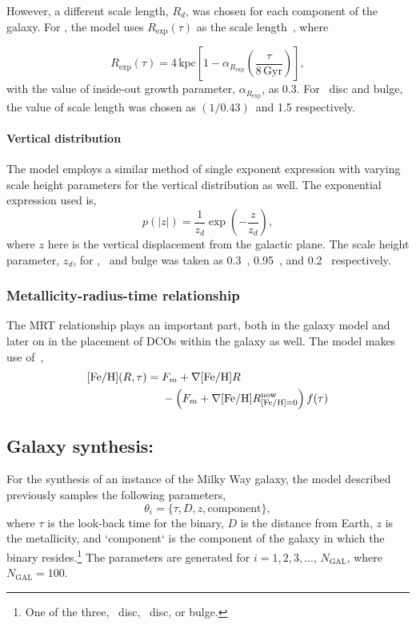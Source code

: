 However, a different scale length, $R_d$, was chosen for each component of the galaxy.
For \lowalpha, the model uses $R_\text{exp}(\tau)$ as the scale length~\cite[Eq 6]{Frankel2018}, where

\begin{equation}%
    R_\text{exp}(\tau) = 4\,\text{kpc}\left[1 - \alpha_{R_\text{exp}}\left(\frac{\tau}{8\,\text{Gyr}}\right)\right],
    \label{eq:exponential_radius_equation}
\end{equation}%
with the value of inside-out growth parameter, $\alpha_{R_\text{exp}}$, as 0.3. For \highalpha\ disc and bulge, the value of scale length was chosen as $(1/0.43)\,$\si{\kpc} and \SI{1.5}{\kpc} respectively.

\paragraph*{\textbf{Vertical distribution}}
The model employs a similar method of single exponent expression with varying scale height parameters for the vertical distribution as well.
The exponential expression used is,
\begin{equation}
    p(|z|) = \frac{1}{z_d}\exp\left(-\frac{z}{z_d}\right),
    \label{eq:vertical_distribution_of_stars}
\end{equation}
where $z$ here is the vertical displacement from the galactic plane.
The scale height parameter, $z_d$, for \lowalpha, \highalpha\ and bulge was taken as \SI{0.3}{\kpc}~\cite{McMillan2011}, \SI{0.95}{\kpc}~\cite{Bovy2016}, and \SI{0.2}{\kpc}~\cite{Wegg2015} respectively.

\subsubsection*{\textbf{Metallicity-radius-time relationship}} The MRT relationship plays an important part, both in the galaxy model and later on in the placement of DCOs within the galaxy as well.
The model makes use of~\cite[Eq. 7]{Frankel2018},
\begin{equation}
    \begin{aligned}
        \feh(R,\tau) = {} & F_m + \nabla\feh R \\
        & - \left(F_m + \nabla\feh R_{\feh=0}^{\text{now}}\right) f(\tau)
    \end{aligned}
\end{equation}

\subsection*{\textbf{Galaxy synthesis:}}
For the synthesis of an instance of the Milky Way galaxy, the model described previously samples the following parameters,
\begin{equation*}
    \theta_i = \{\tau, D, z, \text{component}\},
\end{equation*}
where $\tau$ is the look-back time for the binary, $D$ is the distance from Earth, $z$ is the metallicity, and `component` is the component of the galaxy in which the binary resides.\footnote{One of the three, \lowalpha\ disc, \highalpha\ disc, or bulge.} The parameters are generated for $i = 1, 2, 3, \ldots$, $N_\text{GAL}$, where $N_\text{GAL} = 100$.

